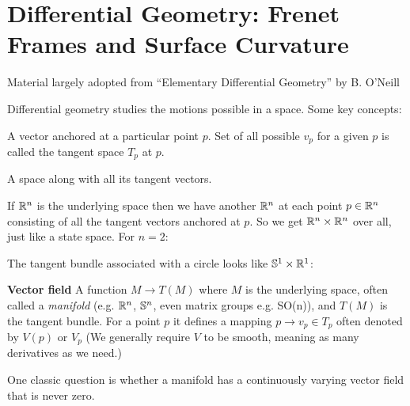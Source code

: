 \chapter{Differential Geometry: Frenet Frames and Surface Curvature}

\begin{remark}
  Material largely adopted from ``Elementary Differential Geometry''
  by B. O'Neill
\end{remark}

Differential geometry studies the motions possible in a space. Some
key concepts:

\begin{definition}
  A vector anchored at a particular
point $p$. Set of all possible $v_p$ for a given $p$ is called the tangent
space $T_p$ at $p$.
\end{definition}


\begin{definition}
  A space along with all its tangent vectors.
\end{definition}


\begin{example}
  If $\mathbb{R}^n$ is the underlying space then we have another $\mathbb{R}^n$
  at each point $p \in \mathbb{R}^n$ consisting of all the tangent vectors
  anchored at $p$. So we get $\mathbb{R}^n \times \mathbb{R}^n$ over all, just
  like a state space. For $n = 2$:
\end{example}

\begin{example}
  The tangent bundle associated with a circle looks like
  $\mathbb{S}^1 \times \mathbb{R}^1$:
\end{example}

\textbf{Vector field} A function $M \rightarrow T(M)$ where $M$ is the
underlying space, often called a \textit{manifold} (e.g. $\mathbb{R}^n$,
$\mathbb{S}^n$, even matrix groups e.g. SO(n)), and $T(M)$ is the tangent
bundle. For a point $p$ it defines a mapping $p \rightarrow v_p \in
T_p$ often denoted by $V(p)$ or $V_p$ (We generally require $V$ to be
smooth, meaning as many derivatives as we need.)

One classic question is whether a manifold has a continuously varying
vector field that is never zero. 
